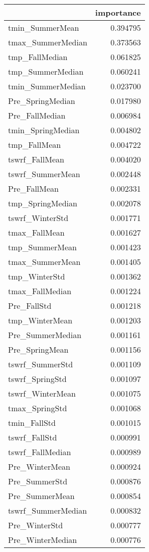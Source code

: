 \begin{tabular}{lr}
\toprule
 & importance \\
\midrule
tmin_SummerMean & 0.394795 \\
tmax_SummerMedian & 0.373563 \\
tmp_FallMedian & 0.061825 \\
tmp_SummerMedian & 0.060241 \\
tmin_SummerMedian & 0.023700 \\
Pre_SpringMedian & 0.017980 \\
Pre_FallMedian & 0.006984 \\
tmin_SpringMedian & 0.004802 \\
tmp_FallMean & 0.004722 \\
tswrf_FallMean & 0.004020 \\
tswrf_SummerMean & 0.002448 \\
Pre_FallMean & 0.002331 \\
tmp_SpringMedian & 0.002078 \\
tswrf_WinterStd & 0.001771 \\
tmax_FallMean & 0.001627 \\
tmp_SummerMean & 0.001423 \\
tmax_SummerMean & 0.001405 \\
tmp_WinterStd & 0.001362 \\
tmax_FallMedian & 0.001224 \\
Pre_FallStd & 0.001218 \\
tmp_WinterMean & 0.001203 \\
Pre_SummerMedian & 0.001161 \\
Pre_SpringMean & 0.001156 \\
tswrf_SummerStd & 0.001109 \\
tswrf_SpringStd & 0.001097 \\
tswrf_WinterMean & 0.001075 \\
tmax_SpringStd & 0.001068 \\
tmin_FallStd & 0.001015 \\
tswrf_FallStd & 0.000991 \\
tswrf_FallMedian & 0.000989 \\
Pre_WinterMean & 0.000924 \\
Pre_SummerStd & 0.000876 \\
Pre_SummerMean & 0.000854 \\
tswrf_SummerMedian & 0.000832 \\
Pre_WinterStd & 0.000777 \\
Pre_WinterMedian & 0.000776 \\

\end{tabular}
